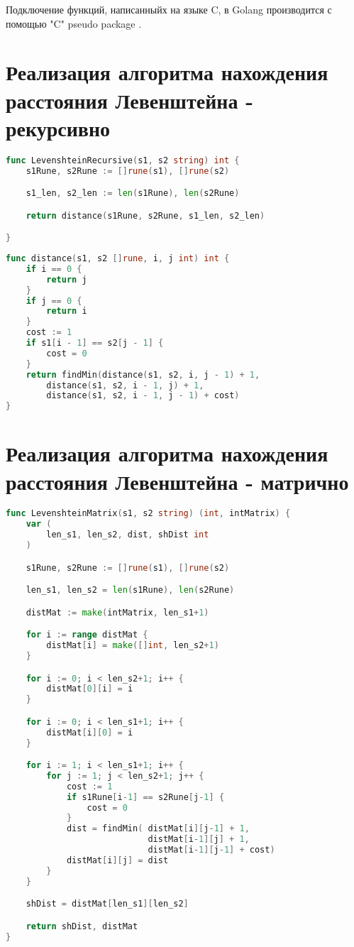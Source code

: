 Подключение функций, написанныйх на языке C, в Golang производится с помощью "C" pseudo package \cite{cgo}.

\section{Реализация алгоритма нахождения расстояния Левенштейна - рекурсивно}

\begin{lstlisting}[language=Go, caption=Реализация алгоритма Левенштейна рекурсивным способом, label=lst_rec]	
func LevenshteinRecursive(s1, s2 string) int {
	s1Rune, s2Rune := []rune(s1), []rune(s2)

	s1_len, s2_len := len(s1Rune), len(s2Rune)

	return distance(s1Rune, s2Rune, s1_len, s2_len)

}
\end{lstlisting}

\begin{lstlisting}[language=Go, caption=Вспомогательная функция distance, label=dist]	
func distance(s1, s2 []rune, i, j int) int {
	if i == 0 {
		return j
	}
	if j == 0 {
		return i
	}
	cost := 1
	if s1[i - 1] == s2[j - 1] {
		cost = 0
	}
	return findMin(distance(s1, s2, i, j - 1) + 1,
		distance(s1, s2, i - 1, j) + 1,
		distance(s1, s2, i - 1, j - 1) + cost)
}
\end{lstlisting}

\section{Реализация алгоритма нахождения расстояния Левенштейна - матрично}

\begin{lstlisting}[language=Go, caption=Реализация алгоритма Левенштейна матричным способом, label=lst_mat]
func LevenshteinMatrix(s1, s2 string) (int, intMatrix) {
	var (
		len_s1, len_s2, dist, shDist int
	)

	s1Rune, s2Rune := []rune(s1), []rune(s2)

	len_s1, len_s2 = len(s1Rune), len(s2Rune)

	distMat := make(intMatrix, len_s1+1)

	for i := range distMat {
		distMat[i] = make([]int, len_s2+1)
	}

	for i := 0; i < len_s2+1; i++ {
		distMat[0][i] = i
	}

	for i := 0; i < len_s1+1; i++ {
		distMat[i][0] = i
	}

	for i := 1; i < len_s1+1; i++ {
		for j := 1; j < len_s2+1; j++ {
			cost := 1
			if s1Rune[i-1] == s2Rune[j-1] {
				cost = 0
			}
			dist = findMin(	distMat[i][j-1] + 1,
							distMat[i-1][j] + 1,
							distMat[i-1][j-1] + cost)
			distMat[i][j] = dist
		}
	}

	shDist = distMat[len_s1][len_s2]

	return shDist, distMat
}
\end{lstlisting}


